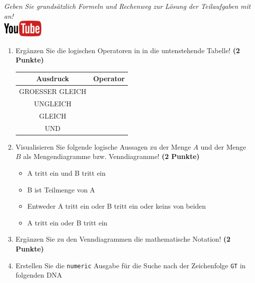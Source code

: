 \documentclass[a4paper, 9pt]{scrartcl}\usepackage[]{graphicx}\usepackage[]{xcolor}
\begin{document}
\textit{Geben Sie grunds{\"a}tzlich Formeln und Rechenweg zur L{\"o}sung der
  Teilaufgaben mit an!} \\[1Ex]

\hfill\href{https://youtu.be/paXxVmyfDPs}{\includegraphics[width =
  2cm]{img/youtube}} %
\hspace{2Ex}

\vspace{1Ex}



\begin{enumerate}
\item Erg{\"a}nzen Sie die logischen Operatoren in \Rlogo in die untenstehende Tabelle!
  \textbf{(2 Punkte)}
  \begin{center}
    \begin{tabular}{c|c}
      \textbf{Ausdruck} & \textbf{Operator} \strut\\ \hline
      GROESSER GLEICH  & \phantom{GROESSER GLEICH}\strut\\ \hline
      UNGLEICH  & \phantom{UNGLEICH}\strut\\ \hline
      GLEICH  & \phantom{GLEICH}\strut\\ \hline
      UND  & \phantom{UND}\strut\\ 
    \end{tabular}
  \end{center}  
\item Visualisieren Sie folgende logische Aussagen zu der Menge $A$ und der Menge
  $B$ als Mengendiagramme bzw. Venndiagramme!
  \textbf{(2 Punkte)}
  \begin{itemize}
  \item A tritt ein und B tritt ein
  \item B ist Teilmenge von A
  \item Entweder A tritt ein oder B tritt ein oder keins von beiden
  \item A tritt ein oder B tritt ein
  \end{itemize}
\item Erg{\"a}nzen Sie zu den Venndiagrammen die mathematische Notation!
  \textbf{(2 Punkte)}
\item Erstellen Sie die \texttt{numeric} \Rlogo Ausgabe f{\"u}r die
  Suche nach der Zeichenfolge \texttt{GT} in folgenden DNA

\end{enumerate}
\end{document}
